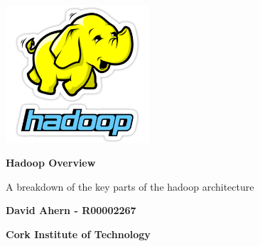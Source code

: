 \begin{titlepage}
    \begin{center}
    	\includegraphics[width=0.4\textwidth]{images/hadoop.png}
    	
        \vspace*{1cm}
        
        \textbf{Hadoop Overview}
        
        \vspace{0.5cm}
        A breakdown of the key parts of the hadoop architecture
        
        \vspace{1.5cm}
        
        \textbf{David Ahern - R00002267}
        
        \vspace{0.5cm}
        \textbf{Cork Institute of Technology}
        
    \end{center}
\end{titlepage}